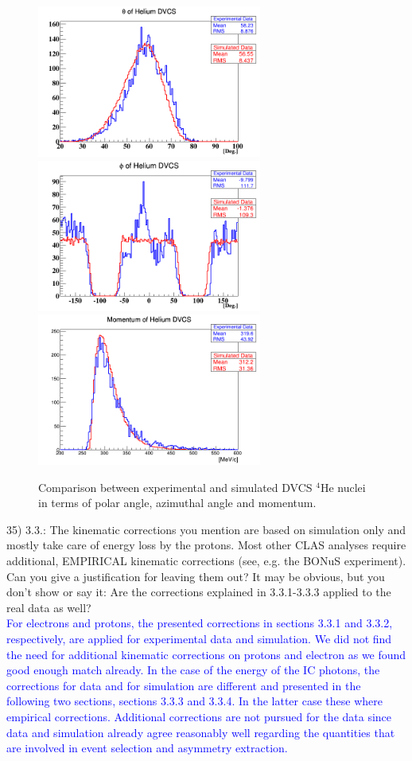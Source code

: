 \begin{figure}[!h]
\includegraphics[height=5.0cm]{fig/He_theta.png}
\includegraphics[height=5.0cm]{fig/He_phi.png}
\centering
\includegraphics[height=5.0cm]{fig/He_mom.png}
\caption{Comparison between experimental and simulated DVCS $^{4}$He nuclei in 
terms of polar angle, azimuthal angle and momentum.}
\label{fig:comp_He}
\end{figure}

35) 3.3.: The kinematic corrections you mention are based on simulation only and 
mostly take care of energy loss by the protons. Most other CLAS analyses 
require additional, EMPIRICAL kinematic corrections (see, e.g. the BONuS 
experiment). Can you give a justification for leaving them out?
It may be obvious, but you don't show or say it: Are the corrections explained 
in 3.3.1-3.3.3 applied to the real data as well?\\
\textcolor{blue}{For electrons and protons, the presented corrections in 
sections 3.3.1 and 3.3.2, respectively, are applied for experimental data and 
simulation. We did not find the need for additional kinematic corrections on 
protons and electron as we found good enough match already.
In the case of the energy of the IC photons, the corrections 
for data and for simulation are different and presented in the following two 
sections, sections 3.3.3 and 3.3.4. In the latter case
these where empirical corrections.  Additional corrections are not pursued
for the data since data and simulation already agree reasonably well regarding
the quantities that are involved in event selection and asymmetry 
extraction.}\\

